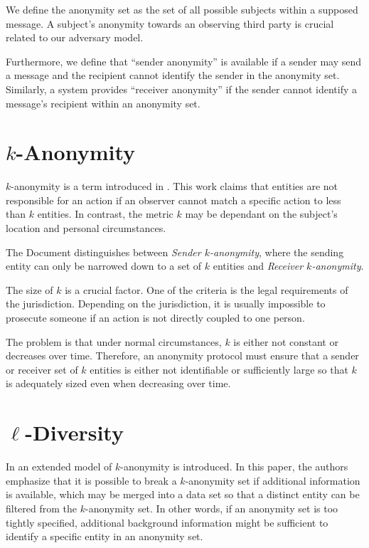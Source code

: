 We define the anonymity set as the set of all possible subjects within a supposed message. A subject's anonymity towards an observing third party is crucial related to our adversary model.

Furthermore, we define that ``sender anonymity'' is available if a sender may send a message and the recipient cannot identify the sender in the anonymity set. Similarly, a system provides ``receiver anonymity'' if the sender cannot identify a message's recipient within an anonymity set.

\section{\texorpdfstring{$k$}{k}-Anonymity}
$k$-anonymity is a term introduced in \cite{k-anonymous:ccs2003}. This work claims that entities are not responsible for an action if an observer cannot match a specific action to less than $k$ entities. In contrast, the metric $k$ may be dependant on the subject's location and personal circumstances.

The Document distinguishes between \textit{Sender $k$-anonymity}, where the sending entity can only be narrowed down to a set of $k$ entities and \textit{Receiver $k$-anonymity}. 

The size of $k$ is a crucial factor. One of the criteria is the legal requirements of the jurisdiction. Depending on the jurisdiction, it is usually impossible to prosecute someone if an action is not directly coupled to one person. 

The problem is that under normal circumstances, $k$ is either not constant or decreases over time. Therefore, an anonymity protocol must ensure that a sender or receiver set of $k$ entities is either not identifiable or sufficiently large so that $k$ is adequately sized even when decreasing over time.

\section{\texorpdfstring{$\ell$}{l}-Diversity}
In \cite{machanavajjhala2007diversity} an extended model of $k$-anonymity is introduced. In this paper, the authors emphasize that it is possible to break a $k$-anonymity set if additional information is available, which may be merged into a data set so that a distinct entity can be filtered from the $k$-anonymity set. In other words, if an anonymity set is too tightly specified, additional background information might be sufficient to identify a specific entity in an anonymity set.

